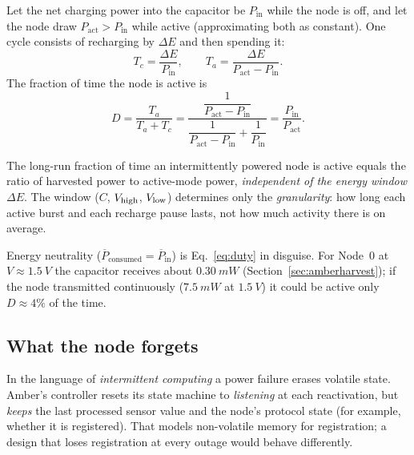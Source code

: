 Let the net charging power into the capacitor be $P_{\mathrm{in}}$ while the node is off, and let the node draw
$P_{\mathrm{act}}>P_{\mathrm{in}}$ while active (approximating both as constant). One cycle consists of
recharging by $\Delta E$ and then spending it:
\[
 T_c=\frac{\Delta E}{P_{\mathrm{in}}},\qquad T_a=\frac{\Delta E}{P_{\mathrm{act}}-P_{\mathrm{in}}}.
\]
The fraction of time the node is active is
\begin{equation}
 D=\frac{T_a}{T_a+T_c}=\frac{\dfrac1{P_{\mathrm{act}}-P_{\mathrm{in}}}}{\dfrac1{P_{\mathrm{act}}-P_{\mathrm{in}}}+\dfrac1{P_{\mathrm{in}}}}
 =\frac{P_{\mathrm{in}}}{P_{\mathrm{act}}}.
\label{eq:duty}
\end{equation}
\begin{keyidea}
The long-run fraction of time an intermittently powered node is active equals the
ratio of harvested power to active-mode power, \emph{independent of the energy window}
$\Delta E$. The window ($C$, $V_{\mathrm{high}}$, $V_{\mathrm{low}}$) determines only the \emph{granularity}: how long each active
burst and each recharge pause lasts, not how much activity there is on average.
\end{keyidea}
Energy neutrality ($\overline{P}_{\mathrm{consumed}}=\overline{P}_{\mathrm{in}}$) is Eq.~\eqref{eq:duty} in disguise.
For Node~0 at $V\approx\SI{1.5}{V}$ the capacitor receives about $\SI{0.30}{mW}$ (Section~\ref{sec:amberharvest}); if the node
transmitted continuously ($\SI{7.5}{mW}$ at $\SI{1.5}{V}$) it could be active only $D\approx4\%$ of the time.

\subsection{What the node forgets}
In the language of \emph{intermittent computing} \citep{lucia2017} a power failure erases volatile state. Amber's controller resets its
state machine to \emph{listening} at each reactivation, but \emph{keeps} the last processed sensor value
and the node's protocol state (for example, whether it is registered). That models non-volatile memory for
registration; a design that loses registration at every outage would behave differently.

